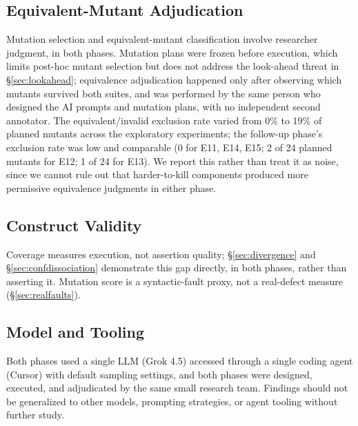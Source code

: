 \documentclass[10pt,conference]{IEEEtran}
\begin{document}
\subsection{Equivalent-Mutant Adjudication}
Mutation selection and equivalent-mutant classification involve researcher judgment, in both phases. Mutation plans were frozen before execution, which limits post-hoc mutant selection but does not address the look-ahead threat in \S\ref{sec:lookahead}; equivalence adjudication happened only after observing which mutants survived both suites, and was performed by the same person who designed the AI prompts and mutation plans, with no independent second annotator. The equivalent/invalid exclusion rate varied from 0\% to 19\% of planned mutants across the exploratory experiments; the follow-up phase's exclusion rate was low and comparable (0 for E11, E14, E15; 2 of 24 planned mutants for E12; 1 of 24 for E13). We report this rather than treat it as noise, since we cannot rule out that harder-to-kill components produced more permissive equivalence judgments in either phase.

\subsection{Construct Validity}
Coverage measures execution, not assertion quality; \S\ref{sec:divergence} and \S\ref{sec:confdissociation} demonstrate this gap directly, in both phases, rather than asserting it. Mutation score is a syntactic-fault proxy, not a real-defect measure (\S\ref{sec:realfaults}).

\subsection{Model and Tooling}
Both phases used a single LLM (Grok 4.5) accessed through a single coding agent (Cursor) with default sampling settings, and both phases were designed, executed, and adjudicated by the same small research team. Findings should not be generalized to other models, prompting strategies, or agent tooling without further study.
\end{document}
